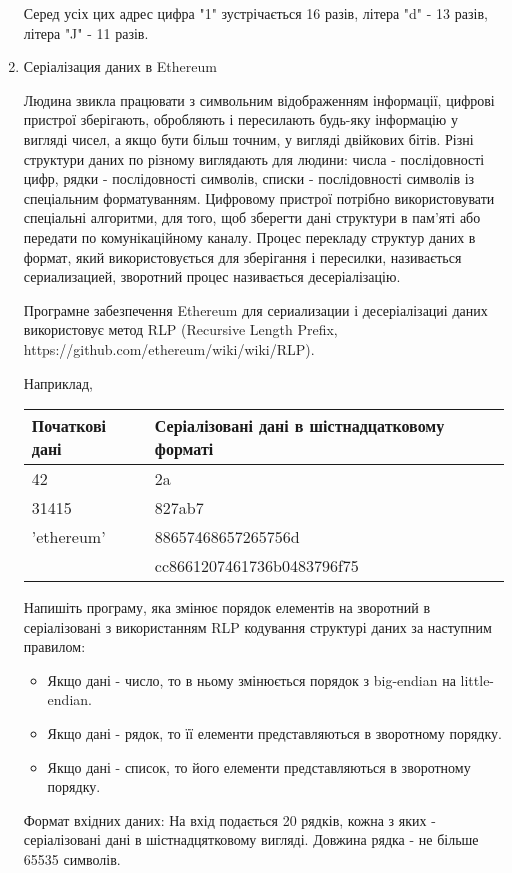 \documentclass[]{article}
\begin{document}
\begin{enumerate}
Серед усіх цих адрес цифра "1" зустрічається 16 разів, літера "d" - 13 разів, літера "J" - 11 разів.

\item
Серіалізация даних в Ethereum

Людина звикла працювати з символьним відображенням інформації, цифрові пристрої зберігають, обробляють і пересилають будь-яку інформацію у вигляді чисел, а якщо бути більш точним, у вигляді двійкових бітів. Різні структури даних по різному виглядають для людини: числа - послідовності цифр, рядки - послідовності символів, списки - послідовності символів із спеціальним форматуванням. Цифровому пристрої потрібно використовувати спеціальні алгоритми, для того, щоб зберегти дані структури в пам'яті або передати по комунікаційному каналу. Процес перекладу структур даних в формат, який використовується для зберігання і пересилки, називається сериализацией, зворотний процес називається десеріалізацію.

Програмне забезпечення Ethereum для сериализации і десеріалізациі даних використовує метод 
 RLP (Recursive
Length Prefix, https://github.com/ethereum/wiki/wiki/RLP).

Наприклад, 

\begin{tabular} {| l | l |} \hline 
 Початкові дані & Серіалізовані дані в шістнадцатковому форматі \\ \hline 
42 & 2a \\ \hline 
31415 & 827ab7 \\ \hline 
'ethereum' & 88657468657265756d \\ \hline 
[ 'a \ task' , 4, 'you'] & cc8661207461736b0483796f75 \\ \hline 
\end{tabular}


Напишіть програму, яка змінює порядок елементів на зворотний в серіалізовані з використанням RLP кодування структурі даних за наступним правилом:
\begin{itemize}
\item
    Якщо дані - число, то в ньому змінюється порядок з big-endian на little-endian.
\item
    Якщо дані - рядок, то її елементи представляються в зворотному порядку.
\item
    Якщо дані - список, то його елементи представляються в зворотному порядку.
\end{itemize}

Формат вхідних даних:
На вхід подається 20 рядків, кожна з яких - серіалізовані дані в шістнадцятковому вигляді. Довжина рядка - не більше 65535 символів.


\end{enumerate}
\end{document}
